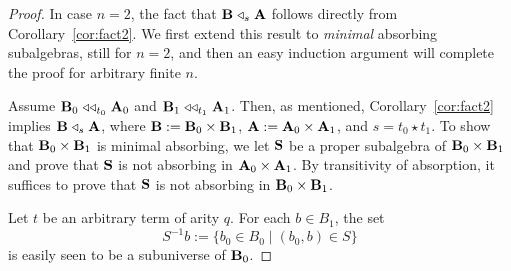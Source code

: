 \begin{proof}
  In case $n=2$, the fact that $\mathbf{B} \mathrel{\triangleleft}_s \mathbf{A}$ follows
  directly from Corollary~\ref{cor:fact2}.
  We first extend this result to \emph{minimal} absorbing subalgebras, still
  for $n=2$, and then an easy induction argument will
  complete the proof for arbitrary finite $n$.

  Assume $\mathbf{B}_0 \mathrel{\triangleleft\triangleleft}_{t_0} \mathbf{A}_0$ and $\mathbf{B}_1 \mathrel{\triangleleft\triangleleft}_{t_1} \mathbf{A}_1$.
  Then, as mentioned, Corollary~\ref{cor:fact2} implies $\mathbf{B} \mathrel{\triangleleft}_s \mathbf{A}$, where
  $\mathbf{B} := \mathbf{B}_0\times \mathbf{B}_1$, $\mathbf{A} := \mathbf{A}_0\times \mathbf{A}_1$,
  and $s = t_0\star t_1$.
  To show that $\mathbf{B}_0\times \mathbf{B}_1$ is minimal absorbing, we
  let $\mathbf{S}$ be a proper subalgebra of $\mathbf{B}_0\times \mathbf{B}_1$ and 
  prove that $\mathbf{S}$ is not absorbing in $\mathbf{A}_0\times \mathbf{A}_1$.
  By transitivity of absorption, it suffices to prove that 
  $\mathbf{S}$ is not absorbing in $\mathbf{B}_0\times \mathbf{B}_1$.

  Let $t$ be an arbitrary term of arity $q$.
  For each $b \in B_1$, the set %
  \[
  S^{-1}b := \{b_0 \in B_0 \mid (b_0, b) \in S\}
  \]
  is easily seen to be a subuniverse of $\mathbf{B}_0$.
\end{proof}
